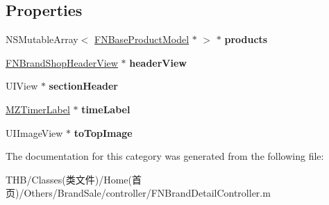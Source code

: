 \subsection*{Properties}
\begin{DoxyCompactItemize}
\item 
\mbox{\label{category_f_n_brand_detail_controller_07_08_ab5bc048e187b0c47a2871a73e82b134d}} 
N\+S\+Mutable\+Array$<$ \mbox{\hyperlink{interface_f_n_base_product_model}{F\+N\+Base\+Product\+Model}} $\ast$ $>$ $\ast$ {\bfseries products}
\item 
\mbox{\label{category_f_n_brand_detail_controller_07_08_a19151f6a8ea4134c2f68fc8d462ed10c}} 
\mbox{\hyperlink{interface_f_n_brand_shop_header_view}{F\+N\+Brand\+Shop\+Header\+View}} $\ast$ {\bfseries header\+View}
\item 
\mbox{\label{category_f_n_brand_detail_controller_07_08_aedb5f364071de51b0d13a74cfaa89f55}} 
U\+I\+View $\ast$ {\bfseries section\+Header}
\item 
\mbox{\label{category_f_n_brand_detail_controller_07_08_adab6e1ed729bf8286b30c8ec94d3db1d}} 
\mbox{\hyperlink{interface_m_z_timer_label}{M\+Z\+Timer\+Label}} $\ast$ {\bfseries time\+Label}
\item 
\mbox{\label{category_f_n_brand_detail_controller_07_08_aa765964f303be932e14ad560febc0d59}} 
U\+I\+Image\+View $\ast$ {\bfseries to\+Top\+Image}
\end{DoxyCompactItemize}


The documentation for this category was generated from the following file\+:\begin{DoxyCompactItemize}
\item 
T\+H\+B/\+Classes(类文件)/\+Home(首页)/\+Others/\+Brand\+Sale/controller/F\+N\+Brand\+Detail\+Controller.\+m\end{DoxyCompactItemize}
